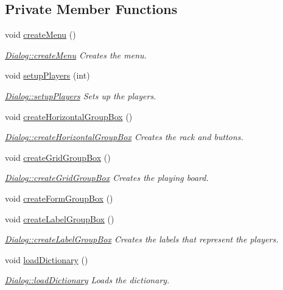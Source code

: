 \subsection*{Private Member Functions}
\begin{DoxyCompactItemize}
\item 
void \hyperlink{class_dialog_a0d839dd1406b5bd21d1e87172d9ba280}{create\-Menu} ()
\begin{DoxyCompactList}\small\item\em \hyperlink{class_dialog_a0d839dd1406b5bd21d1e87172d9ba280}{Dialog\-::create\-Menu} Creates the menu. \end{DoxyCompactList}\item 
void \hyperlink{class_dialog_ab91c0d44d997ee5dc3c9f43866674ec1}{setup\-Players} (int)
\begin{DoxyCompactList}\small\item\em \hyperlink{class_dialog_ab91c0d44d997ee5dc3c9f43866674ec1}{Dialog\-::setup\-Players} Sets up the players. \end{DoxyCompactList}\item 
void \hyperlink{class_dialog_a0815afc1d0d96fd6e1e3f92a8e017aeb}{create\-Horizontal\-Group\-Box} ()
\begin{DoxyCompactList}\small\item\em \hyperlink{class_dialog_a0815afc1d0d96fd6e1e3f92a8e017aeb}{Dialog\-::create\-Horizontal\-Group\-Box} Creates the rack and buttons. \end{DoxyCompactList}\item 
void \hyperlink{class_dialog_a1801636f9eaba94d525a6d174608d4ca}{create\-Grid\-Group\-Box} ()
\begin{DoxyCompactList}\small\item\em \hyperlink{class_dialog_a1801636f9eaba94d525a6d174608d4ca}{Dialog\-::create\-Grid\-Group\-Box} Creates the playing board. \end{DoxyCompactList}\item 
void \hyperlink{class_dialog_a5b7a947ae39abb184aca126baaf5b574}{create\-Form\-Group\-Box} ()
\item 
void \hyperlink{class_dialog_a3e7333b738c6b84b861dac7ea957244a}{create\-Label\-Group\-Box} ()
\begin{DoxyCompactList}\small\item\em \hyperlink{class_dialog_a3e7333b738c6b84b861dac7ea957244a}{Dialog\-::create\-Label\-Group\-Box} Creates the labels that represent the players. \end{DoxyCompactList}\item 
void \hyperlink{class_dialog_a40d6cd5ec81c87ff483fb399075963b3}{load\-Dictionary} ()
\begin{DoxyCompactList}\small\item\em \hyperlink{class_dialog_a40d6cd5ec81c87ff483fb399075963b3}{Dialog\-::load\-Dictionary} Loads the dictionary. \end{DoxyCompactList}\end{DoxyCompactItemize}
